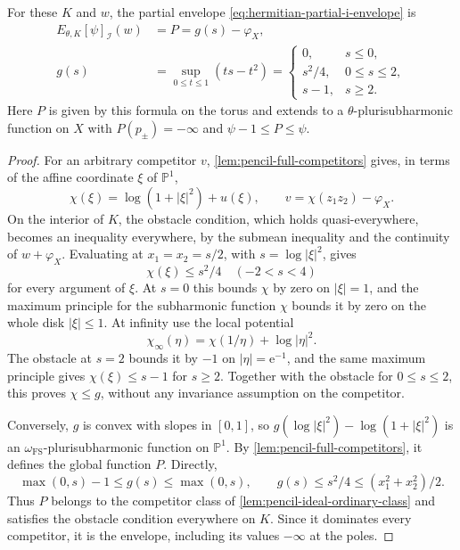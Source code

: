 \begin{theorem}\label{thm:pencil-ideal-envelope}
For these $K$ and $w$, the partial envelope \eqref{eq:hermitian-partial-i-envelope} is
\[
 \begin{aligned}
 E_{\theta,K}[\psi]_{\mathcal I}(w)&=P=g(s)-\varphi_X,\\
 g(s)&=\sup_{0\leq t\leq1}(ts-t^2)
      =\begin{cases}
         0,&s\leq0,\\
         s^2/4,&0\leq s\leq2,\\
         s-1,&s\geq2.
        \end{cases}
 \end{aligned}
\]
Here $P$ is given by this formula on the torus and extends to a $\theta$-plurisubharmonic function on $X$ with $P(p_\pm)=-\infty$ and $\psi-1\leq P\leq\psi$.
\end{theorem}
\begin{proof}
For an arbitrary competitor $v$, \cref{lem:pencil-full-competitors} gives, in terms of the affine coordinate $\xi$ of $\mathbb P^1$,
\[
 \chi(\xi)=\log(1+|\xi|^2)+u(\xi),
 \qquad v=\chi(z_1z_2)-\varphi_X.
\]
On the interior of $K$, the obstacle condition, which holds quasi-everywhere, becomes an inequality everywhere, by the submean inequality and the continuity of $w+\varphi_X$. Evaluating at $x_1=x_2=s/2$, with $s=\log|\xi|^2$, gives
\[
 \chi(\xi)\leq s^2/4\quad(-2<s<4)
\]
for every argument of $\xi$. At $s=0$ this bounds $\chi$ by zero on $|\xi|=1$, and the maximum principle for the subharmonic function $\chi$ bounds it by zero on the whole disk $|\xi|\leq1$. At infinity use the local potential
\[
 \chi_\infty(\eta)=\chi(1/\eta)+\log|\eta|^2.
\]
The obstacle at $s=2$ bounds it by $-1$ on $|\eta|=\mathrm e^{-1}$, and the same maximum principle gives $\chi(\xi)\leq s-1$ for $s\geq2$. Together with the obstacle for $0\leq s\leq2$, this proves $\chi\leq g$, without any invariance assumption on the competitor.

Conversely, $g$ is convex with slopes in $[0,1]$, so $g(\log|\xi|^2)-\log(1+|\xi|^2)$ is an $\omega_{\mathrm{FS}}$-plurisubharmonic function on $\mathbb P^1$. By \cref{lem:pencil-full-competitors}, it defines the global function $P$. Directly,
\[
 \max(0,s)-1\leq g(s)\leq\max(0,s),\qquad
 g(s)\leq s^2/4\leq(x_1^2+x_2^2)/2.
\]
Thus $P$ belongs to the competitor class of \cref{lem:pencil-ideal-ordinary-class} and satisfies the obstacle condition everywhere on $K$. Since it dominates every competitor, it is the envelope, including its values $-\infty$ at the poles.
\end{proof}

